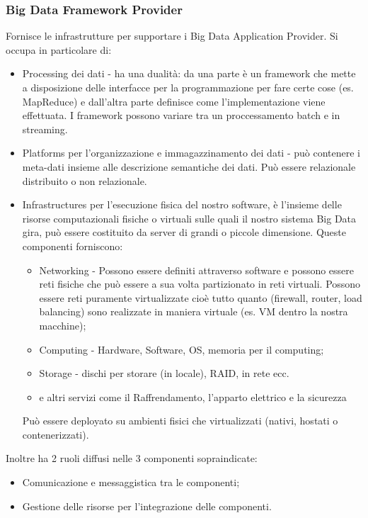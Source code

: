 \documentclass[11pt, twocolumn]{article}
\newenvironment{myitemize}
{ \begin{itemize}
		\setlength{\itemsep}{0pt}
		\setlength{\parskip}{0pt}
		\setlength{\parsep}{0pt}     }
	{ \end{itemize}                  }
\begin{document}
\subsubsection{Big Data Framework Provider}
Fornisce le infrastrutture per supportare i Big Data Application Provider. Si occupa in particolare di:
\begin{myitemize}
	\item Processing dei dati - ha una dualità: da una parte è un framework che mette a disposizione delle interfacce per la programmazione per fare certe cose (es. MapReduce) e dall'altra parte definisce come l'implementazione viene effettuata. I framework possono variare tra un proccessamento batch e in streaming.
	\item Platforms per l'organizzazione e immagazzinamento dei dati - può contenere i meta-dati insieme alle descrizione semantiche dei dati. 
	Può essere relazionale distribuito o non relazionale.
	\item Infrastructures per l'esecuzione fisica del nostro software, è l'insieme delle risorse computazionali fisiche o virtuali sulle quali il nostro sistema Big Data gira, può essere costituito da server di grandi o piccole dimensione. 
	Queste componenti forniscono:
	\begin{myitemize}
		\item Networking - Possono essere definiti attraverso software e possono essere reti fisiche che può essere a sua volta partizionato in reti virtuali. 
		Possono essere reti puramente virtualizzate cioè tutto quanto (firewall, router, load balancing) sono realizzate in maniera virtuale (es. VM dentro la nostra macchine);
		\item Computing - Hardware, Software, OS, memoria per il computing;
		\item Storage - dischi per storare (in locale), RAID, in rete ecc.
		\item e altri servizi come il Raffrendamento, l'apparto elettrico e la sicurezza
	\end{myitemize}
	Può essere deployato su ambienti fisici che virtualizzati (nativi, hostati o contenerizzati).
\end{myitemize}
Inoltre ha 2 ruoli diffusi nelle 3 componenti sopraindicate:
\begin{myitemize}
	\item Comunicazione e messaggistica tra le componenti;
	\item Gestione delle risorse per l'integrazione delle componenti.
\end{myitemize}
\end{document}
